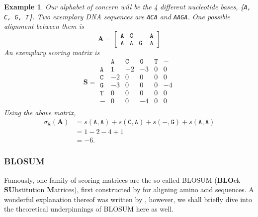 \documentclass{article}
\newtheorem{example}{Example}
\begin{document}
\begin{example}
    Our alphabet of concern will be the 4
    different nucleotide bases, \{\texttt{A, C, G, T}\}. Two exemplary DNA
    sequences are \texttt{ACA} and \texttt{AAGA}. One possible alignment between them is
    \begin{equation*}
        \mathbf A = \begin{bmatrix}
            \mathtt{A} & \mathtt{C} & \mathtt{-} & \mathtt{A} \\
            \mathtt{A} & \mathtt{A} & \mathtt{G} & \mathtt{A}
        \end{bmatrix}
    \end{equation*}
    An exemplary scoring matrix is 
    \begin{equation*}
        \mathbf S = \begin{matrix}
             & \mathtt{A} & \mathtt{C} & \mathtt{G} & \mathtt{T} &
            \mathtt{-}                                             \\ \mathtt{A} & 1          & -2         & -3         & 0
             &
            0
            \\ \mathtt{C} & -2         & 0          & 0          & 0
             & 0
            \\ \mathtt{G} & -3         & 0          & 0          & 0
             & -4
            \\ \mathtt{T} & 0          & 0          & 0          & 0
             & 0
            \\ \mathtt{-} & 0          & 0          & -4         & 0
             & 0 \\
        \end{matrix}
    \end{equation*}
    Using the above matrix, \begin{align}
	    \sigma_{\mathbf S}(\mathbf A) &= s(\mathtt A, \mathtt A) + s(\mathtt C, \mathtt A) + s(\mathtt{-}, \mathtt{G}) + s(\mathtt{A}, \mathtt{A}) \\
					  &= 1 - 2 -4 + 1 \\
					  &= -6.
    \end{align}
\end{example}

\subsubsection*{BLOSUM}
Famously, one family of scoring matrices are the so called BLOSUM (\textbf{BLO}ck \textbf{SU}bstitution \textbf{M}atrices), first constructed by \textcite{henikoffAminoAcidSubstitution1992} for aligning amino acid sequences. A wonderful explanation thereof was written by
\textcite{eddyWhereDidBLOSUM622004}, however, we shall briefly dive into the
theoretical underpinnings of BLOSUM here as well.
\end{document}
